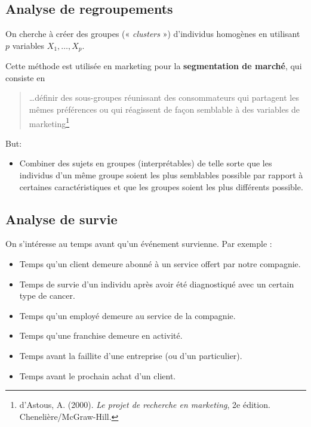 \documentclass[
]{book}
\providecommand{\tightlist}{%
  \setlength{\itemsep}{0pt}\setlength{\parskip}{0pt}}
\theoremstyle{definition}
\theoremstyle{definition}
\theoremstyle{definition}
\theoremstyle{remark}
\let\BeginKnitrBlock\begin \let\EndKnitrBlock\end
\begin{document}
\hypertarget{analyse-de-regroupements}{%
\subsection{Analyse de regroupements}\label{analyse-de-regroupements}}

On cherche à créer des groupes (« \emph{clusters} ») d'individus homogènes en utilisant \(p\) variables \(X_1, \ldots, X_p\).

\BeginKnitrBlock{example}
\protect\hypertarget{exm:unnamed-chunk-3}{}{\label{exm:unnamed-chunk-3} }
Cette méthode est utilisée en marketing pour la \textbf{segmentation de marché}, qui consiste en

\begin{quote}
\ldots définir des sous-groupes réunissant des consommateurs qui partagent les mêmes préférences ou qui réagissent de façon semblable à des variables de marketing\footnote{d'Astous, A. (2000). \emph{Le projet de recherche en marketing}, 2e édition. Chenelière/McGraw-Hill. }
\end{quote}
\EndKnitrBlock{example}

But:

\begin{itemize}
\tightlist
\item
  Combiner des sujets en groupes (interprétables) de telle sorte que les individus d'un même groupe soient les plus semblables possible par rapport à certaines caractéristiques et que les groupes soient les plus différents possible.
\end{itemize}

\hypertarget{analyse-de-survie}{%
\subsection{Analyse de survie}\label{analyse-de-survie}}

On s'intéresse au temps avant qu'un événement survienne. Par exemple :

\begin{itemize}
\tightlist
\item
  Temps qu'un client demeure abonné à un service offert par notre compagnie.
\item
  Temps de survie d'un individu après avoir été diagnostiqué avec un certain type de cancer.
\item
  Temps qu'un employé demeure au service de la compagnie.
\item
  Temps qu'une franchise demeure en activité.
\item
  Temps avant la faillite d'une entreprise (ou d'un particulier).
\item
  Temps avant le prochain achat d'un client.
\end{itemize}
\end{document}
